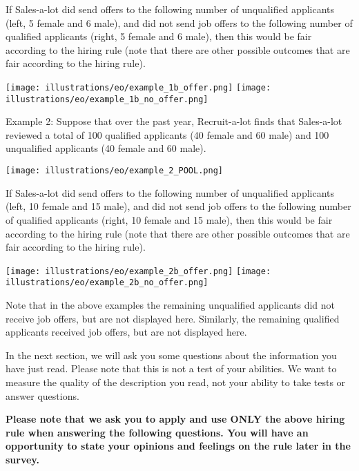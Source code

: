 \documentclass{article}
\begin{document}
If Sales-a-lot did send offers to the following number of unqualified applicants (left, 5 female and 6 male), and did not send job offers to the following number of qualified applicants (right, 5 female and 6 male), then this would be fair according to the hiring rule (note that there are other possible outcomes that are fair according to the hiring rule).

\texttt{[image: illustrations/eo/example\_1b\_offer.png]}
\space\space\space
\texttt{[image: illustrations/eo/example\_1b\_no\_offer.png]}

Example 2: Suppose that over the past year, Recruit-a-lot finds that Sales-a-lot reviewed a total of 100 qualified applicants (40 female and 60 male) and 100 unqualified applicants (40 female and 60 male).

\texttt{[image: illustrations/eo/example\_2\_POOL.png]}

If Sales-a-lot did send offers to the following number of unqualified applicants (left, 10 female and 15 male), and did not send job offers to the following number of qualified applicants (right, 10 female and 15 male), then this would be fair according to the hiring rule (note that there are other possible outcomes that are fair according to the hiring rule).

\texttt{[image: illustrations/eo/example\_2b\_offer.png]}
\space\space\space
\texttt{[image: illustrations/eo/example\_2b\_no\_offer.png]}

Note that in the above examples the remaining unqualified applicants did not receive job offers, but are not displayed here. Similarly, the remaining qualified applicants received job offers, but are not displayed here.

In the next section, we will ask you some questions about the information you have just read. Please note that this is not a test of your abilities. We want to measure the quality of the description you read, not your ability to take tests or answer questions.

\textbf{Please note that we ask you to apply and use ONLY the above hiring rule when answering the following questions. You will have an opportunity to state your opinions and feelings on the rule later in the survey.}
\end{document}
